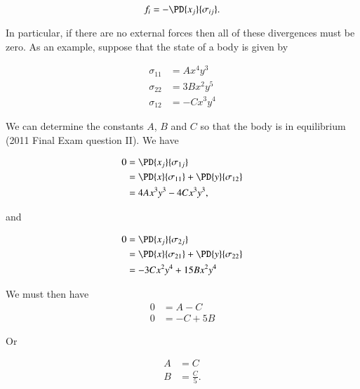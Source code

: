 \begin{equation}\label{eqn:continuumFluidsReviewXX:1090b}
f_i = - \PD{x_j}{\sigma_{ij}}.
\end{equation}

In particular, if there are no external forces then all of these divergences must be zero.  As an example, suppose that the state of a body is given by

\begin{equation}\label{eqn:continuumFluidsReviewXX:3130}
\begin{aligned}
\sigma_{11} &= A x^4 y^3 \\
\sigma_{22} &= 3 B x^2 y^5 \\
\sigma_{12} &= -C x^3 y^4
\end{aligned}
\end{equation}

We can determine the constants $A$, $B$ and $C$ so that the body is in equilibrium (2011 Final Exam question II).  We have

\begin{equation}\label{eqn:continuumFluidsReviewXX:3150}
\begin{aligned}
0 
&= \PD{x_j}{\sigma_{1j}} \\
&= 
\PD{x}{\sigma_{11}} + \PD{y}{\sigma_{12}} \\
&= 4 A x^3 y^3 - 4 C x^3 y^3,
\end{aligned}
\end{equation}

and

\begin{equation}\label{eqn:continuumFluidsReviewXX:3170}
\begin{aligned}
0 
&= \PD{x_j}{\sigma_{2j}} \\
&= 
\PD{x}{\sigma_{21}} + \PD{y}{\sigma_{22}} \\
&= -3 C x^2 y^4 + 15 B x^2 y^4
\end{aligned}
\end{equation}

We must then have
\begin{equation}\label{eqn:continuumFluidsReviewXX:3190}
\begin{aligned}
0 &= A - C \\
0 &= -C + 5 B
\end{aligned}
\end{equation} 

Or

\begin{equation}\label{eqn:continuumFluidsReviewXX:3210}
\begin{aligned}
A &= C \\
B &= \frac{C}{5}.
\end{aligned}
\end{equation}


